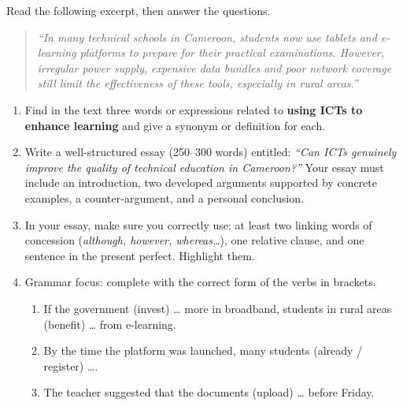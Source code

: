 \documentclass[11pt]{article}
\begin{document}
\begin{exercice}
Read the following excerpt, then answer the questions.

\begin{quote}
\textit{``In many technical schools in Cameroon, students now use tablets and e-learning platforms to prepare for their practical examinations. However, irregular power supply, expensive data bundles and poor network coverage still limit the effectiveness of these tools, especially in rural areas.''}
\end{quote}

\begin{enumerate}
\item Find in the text three words or expressions related to \textbf{using ICTs to enhance learning} and give a synonym or definition for each.
\item Write a well-structured essay (250--300 words) entitled: \textit{``Can ICTs genuinely improve the quality of technical education in Cameroon?''} Your essay must include an introduction, two developed arguments supported by concrete examples, a counter-argument, and a personal conclusion.
\item In your essay, make sure you correctly use: at least two linking words of concession (\textit{although, however, whereas\ldots}), one relative clause, and one sentence in the present perfect. Highlight them.
\item Grammar focus: complete with the correct form of the verbs in brackets.
\begin{enumerate}
\item If the government (invest) \ldots{} more in broadband, students in rural areas (benefit) \ldots{} from e-learning.
\item By the time the platform was launched, many students (already / register) \ldots{}.
\item The teacher suggested that the documents (upload) \ldots{} before Friday.
\end{enumerate}
\end{enumerate}
\end{exercice}
\end{document}
